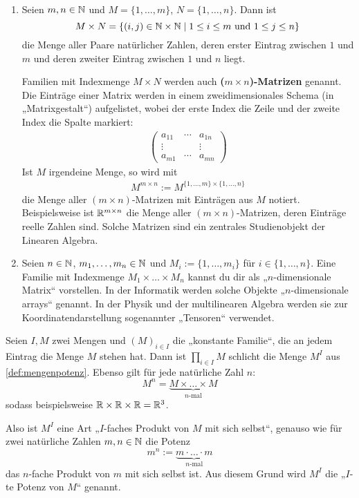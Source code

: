 \begin{bsp} \label{bsp:matrizen}  \quad
    \begin{enumerate}
        \item Seien $m,n\in \mathbb N$ und $M=\{1,\dots , m\}$, $N=\{1,\dots,n\}$. Dann ist
            \[ M\times N = \{ (i,j) \in \mathbb N\times \mathbb N \mid 1\le i\le m \ \text{und}\ 1\le j \le n \} \]
        die Menge aller Paare natürlicher Zahlen, deren erster Eintrag zwischen $1$ und $m$ und deren zweiter Eintrag zwischen $1$ und $n$ liegt.

        Familien mit Indexmenge $M\times N$ werden auch \textbf{($m\times n$)-Matrizen} genannt. Die Einträge einer Matrix werden in einem zweidimensionales Schema (in „Matrixgestalt“) aufgelistet, wobei der erste Index die Zeile und der zweite Index die Spalte markiert:
        \begin{align*}
            \begin{pmatrix}
                a_{11} & \cdots & a_{1n} \\
                \vdots && \vdots \\
                a_{m1} & \cdots & a_{mn}
            \end{pmatrix}
        \end{align*}
        Ist $M$ irgendeine Menge, so wird mit
        \begin{align*}
            M^{m\times n} := M^{\{1,\dots , m\}\times \{1,\dots , n\}}
        \end{align*}
        die Menge aller $(m\times n)$-Matrizen mit Einträgen aus $M$ notiert. Beispielsweise ist $\mathbb R^{m\times n}$ die Menge aller $(m\times n)$-Matrizen, deren Einträge reelle Zahlen sind. Solche Matrizen sind ein zentrales Studienobjekt der Linearen Algebra.
        \item Seien $n\in \mathbb N$, $m_1,\dots , m_n\in \mathbb N$ und $M_i:=\{1,\dots , m_i\}$ für $i\in \{1,\dots , n\}$. Eine Familie mit Indexmenge $M_1\times\ldots\times M_n$ kannst du dir als „$n$-dimensionale Matrix“ vorstellen. In der Informatik werden solche Objekte „$n$-dimensionale arrays“ genannt. In der Physik und der multilinearen Algebra werden sie zur Koordinatendarstellung sogenannter „Tensoren“ verwendet.
    \end{enumerate}
\end{bsp}


\begin{bem}
    Seien $I,M$ zwei Mengen und $(M)_{i\in I}$ die „konstante Familie“, die an jedem Eintrag die Menge $M$ stehen hat. Dann ist $\prod_{i\in I} M$ schlicht die Menge $M^I$ aus \cref{def:mengenpotenz}. Ebenso gilt für jede natürliche Zahl $n$:
        \[ M^n = \underbrace{M\times\ldots\times M}_{\text{$n$-mal}} \]
    sodass beispielsweise $\mathbb R\times \mathbb R\times \mathbb R= \mathbb R^3$.

    Also ist $M^I$ eine Art „$I$-faches Produkt von $M$ mit sich selbst“, genauso wie für zwei natürliche Zahlen $m,n\in \mathbb N$ die Potenz
        \[ m^n := \underbrace{m\cdot\ldots\cdot m}_{\text{$n$-mal}}\]
    das $n$-fache Produkt von $m$ mit sich selbst ist. Aus diesem Grund wird $M^I$ die „$I$-te Potenz von $M$“ genannt.
\end{bem}


